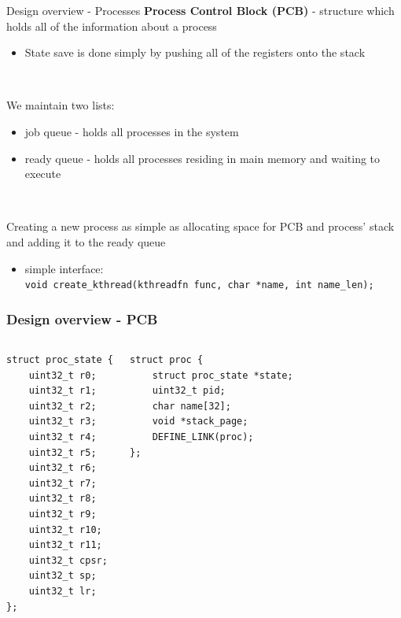 \documentclass[10pt]{beamer}
\newcommand{\code}[1]{\texttt{#1}}
\begin{document}
\begin{frame}{Design overview - Processes}
    \textbf{Process Control Block (PCB)} - structure which holds all of the
    information about a process
    \begin{itemize}
        \item State save is done simply by pushing all of the registers onto the
            stack
    \end{itemize} ~

    We maintain two lists:
    \begin{itemize}
        \item job queue - holds all processes in the system
        \item ready queue - holds all processes residing in main memory and
            waiting to execute
    \end{itemize} ~

    Creating a new process as simple as allocating space for PCB and process'
    stack and adding it to the ready queue
    \begin{itemize}
        \item simple interface: \\
        \code{void create\_kthread(kthreadfn func, char *name, int name\_len);}
    \end{itemize}
\end{frame}

\begin{frame}[fragile]
    \frametitle{Design overview - PCB}

    \begin{columns}
        \lstset{language=C,basicstyle=\ttfamily}
        \begin{lstlisting}
struct proc_state {
    uint32_t r0;
    uint32_t r1;
    uint32_t r2;
    uint32_t r3;
    uint32_t r4;
    uint32_t r5;
    uint32_t r6;
    uint32_t r7;
    uint32_t r8;
    uint32_t r9;
    uint32_t r10;
    uint32_t r11;
    uint32_t cpsr;
    uint32_t sp;
    uint32_t lr;
};
        \end{lstlisting}

        \lstset{language=C,basicstyle=\ttfamily}
        \begin{lstlisting}
struct proc {
    struct proc_state *state;
    uint32_t pid;
    char name[32];
    void *stack_page;
    DEFINE_LINK(proc);
};
        \end{lstlisting}
    \end{columns}

\end{frame}
\end{document}
